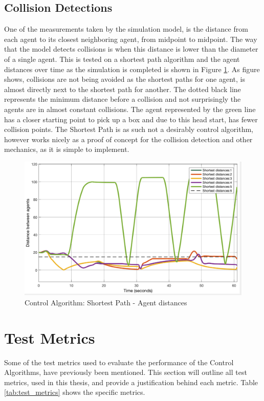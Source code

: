 \subsection{Collision Detections}
One of the measurements taken by the simulation model, is the distance from each agent to its closest neighboring agent, from midpoint to midpoint. The way that the model detects collisions is when this distance is lower than the diameter of a single agent. This is tested on a shortest path algorithm and the agent distances over time as the simulation is completed is shown in Figure \ref{fig:short_dist}. As figure shows, collisions are not being avoided as the shortest paths for one agent, is almost directly next to the shortest path for another. The dotted black line represents the minimum distance before a collision and not surprisingly the agents are in almost constant collisions. The agent represented by the green line has a closer starting point to pick up a box and due to this head start, has fewer collision points. The Shortest Path is as such not a desirably control algorithm, however works nicely as a proof of concept for the collision detection and other mechanics, as it is simple to implement. 

\begin{figure}[H]
  \centering
  \includegraphics[width=0.8\columnwidth]{figures/MA_agent_overlap}
  \caption{\label{fig:short_dist}Control Algorithm: Shortest Path - Agent distances}
\end{figure}

\section{Test Metrics}
\label{sec:test_metrics}
Some of the test metrics used to evaluate the performance of the Control Algorithms, have previously been mentioned. This section will outline all test metrics, used in this thesis, and provide a justification behind each metric. Table \ref{tab:test_metrics} shows the specific metrics.


